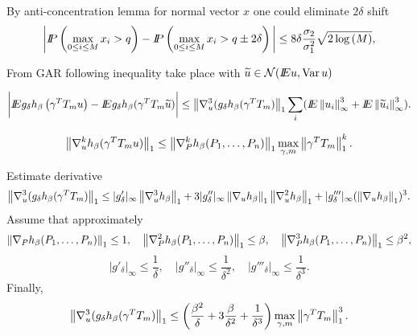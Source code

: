 By anti-concentration lemma for normal vector $x$ one could  eliminate $2\delta$ shift
\[
\bigg| \P \left(\max_{0\leq i \leq M} x_i > q \right) - 
\P \left( \max_{0\leq i \leq M} x_i > q \pm 2\delta \right) \bigg| 
\leq 
8 \delta \frac{\sigma_2}{\sigma_1^2} \sqrt{2 \log \left(  M \right)},
\] 

From GAR following inequality take place with $\widetilde{u} \in \ND(\E u, \Var u)$

 \[
 \bigg\vert \E g_\delta h_\beta \left(  \gamma^{T} T_m u \right)  -  \E g_{\delta} h_\beta(  \gamma^{T} T_m \widetilde{u} ) \bigg\vert 
 \leq 
 \normp{ \nabla_u^{3} (g_\delta h_\beta (\gamma^{T} T_m) }_1 \sum_i 
( \E \normp{u_i}^3_\infty + \E \normp{\widetilde{u}_i}^3_\infty ).
\]

\begin{lemma}
\[
\normp{\nabla_u^{k} h_\beta (  \gamma^{T} T_m u ) }_1 \leq 
\normp{\nabla^{k}_P h_\beta (P_1, \ldots, P_n) }_1 \max_{\gamma, m} \normp{\gamma^{T} T_m}^k_1.
\]
\end{lemma}

Estimate derivative 
\[
 \normp{ \nabla_u^{3} (g_\delta h_\beta (\gamma^{T} T_m) }_1 \leq |g'_\delta |_\infty  \normp{\nabla^3_u h_\beta}_1   + 3 | g''_\delta |_\infty \normp{\nabla_u h_\beta}_1 \normp{\nabla^2_u h_\beta}_1 + |g'''_\delta |_\infty (\normp{\nabla_u h_\beta}_1)^{3}.
\]
Assume that approximately
\[
 \normp{\nabla_P h_\beta (P_1, \ldots, P_n) }_1 \leq 1, 
 \quad  
 \normp{\nabla^2_P h_\beta (P_1, \ldots, P_n) }_1 \leq \beta, 
 \quad
 \normp{\nabla^3_P h_\beta (P_1, \ldots, P_n) }_1 \leq \beta^2,  
\]
\[
|g'_\delta|_{\infty} \leq \frac{1}{\delta},
\quad
|g''_\delta|_{\infty} \leq \frac{1}{\delta^2}, 
\quad
|g'''_\delta|_{\infty} \leq \frac{1}{\delta^3}. 
\]
Finally,
\[
\normp{ \nabla_u^{3} (g_\delta h_\beta (\gamma^{T} T_m) }_1 \leq 
\left(
\frac{\beta^2}{\delta} +
 3\frac{\beta}{\delta^2} +
\frac{1}{\delta^3}
\right) \max_{\gamma, m} \normp{\gamma^{T} T_m}^3_1.
\]


